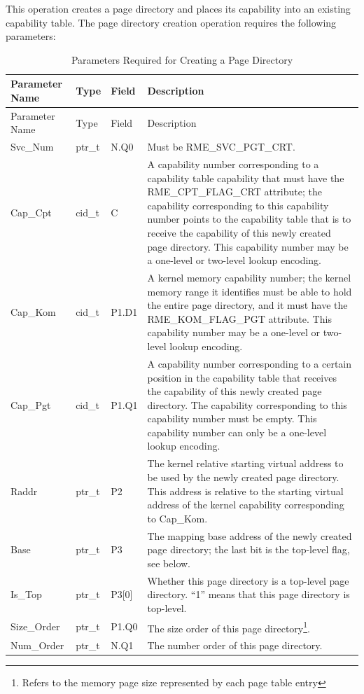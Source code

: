 This operation creates a page directory and places its capability into an existing capability table. The page directory creation operation requires the following parameters:

\begin{xltabular}{\textwidth}{@{}>{\hsize\raggedright\arraybackslash}X>{\hsize\raggedright\arraybackslash}X>{\hsize\raggedright\arraybackslash}X>{\hsize\raggedright\arraybackslash}X@{}}
\caption{Parameters Required for Creating a Page Directory}\label{tab:3-10-create-page-directory-parameters}\\
\toprule
Parameter Name & Type & Field & Description\tabularnewline
\endfirsthead
\toprule
Parameter Name & Type & Field & Description\tabularnewline
\midrule
\endhead
\bottomrule
\endlastfoot
Svc\_Num & ptr\_t & N.Q0 & Must be RME\_SVC\_PGT\_CRT.\tabularnewline
Cap\_Cpt & cid\_t & C &
A capability number corresponding to a capability table capability that must have the RME\_CPT\_FLAG\_CRT attribute; the capability corresponding to this capability number points to the capability table that is to receive the capability of this newly created page directory. This capability number may be a one-level or two-level lookup encoding.\tabularnewline
Cap\_Kom & cid\_t & P1.D1 &
A kernel memory capability number; the kernel memory range it identifies must be able to hold the entire page directory, and it must have the RME\_KOM\_FLAG\_PGT attribute. This capability number may be a one-level or two-level lookup encoding.\tabularnewline
Cap\_Pgt & cid\_t & P1.Q1 &
A capability number corresponding to a certain position in the capability table that receives the capability of this newly created page directory. The capability corresponding to this capability number must be empty. This capability number can only be a one-level lookup encoding.\tabularnewline
Raddr & ptr\_t & P2 &
The kernel relative starting virtual address to be used by the newly created page directory. This address is relative to the starting virtual address of the kernel capability corresponding to Cap\_Kom.\tabularnewline
Base & ptr\_t & P3 &
The mapping base address of the newly created page directory; the last bit is the top-level flag, see below.\tabularnewline
Is\_Top & ptr\_t & P3{[}0{]} &
Whether this page directory is a top-level page directory. ``1'' means that this page directory is top-level.\tabularnewline
Size\_Order & ptr\_t & P1.Q0 &
The size order of this page directory\footnote{Refers to the memory page size represented by each page table entry}.\tabularnewline
Num\_Order & ptr\_t & N.Q1 & The number order of this page directory.\tabularnewline
\end{xltabular}
\nopagebreak[4]

